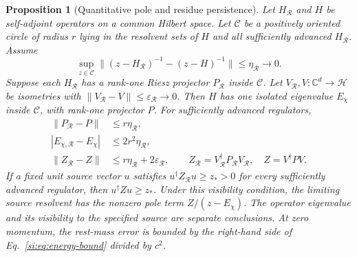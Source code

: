 \documentclass[11pt,a4paper]{article}
\newtheorem{proposition}{Proposition}\renewcommand{\theproposition}{S\arabic{proposition}}
\begin{document}
\begin{proposition}[Quantitative pole and residue persistence]\label{si:prop:persistence}
Let $H_{\mathcal R}$ and $H$ be self-adjoint operators on a common Hilbert space. Let $\mathcal C$ be a positively oriented circle of radius $r$ lying in the resolvent sets of $H$ and all sufficiently advanced $H_{\mathcal R}$. Assume
\begin{equation}\label{si:eq:resolvent-limit}
\sup_{z\in\mathcal C}\|(z-H_{\mathcal R})^{-1}-(z-H)^{-1}\|\leq\eta_{\mathcal R}\longrightarrow0.
\end{equation}
Suppose each $H_{\mathcal R}$ has a rank-one Riesz projector $P_{\mathcal R}$ inside $\mathcal C$. Let $V_{\mathcal R},V:\mathbb C^d\to\mathcal H$ be isometries with $\|V_{\mathcal R}-V\|\leq\varepsilon_{\mathcal R}\to0$. Then $H$ has one isolated eigenvalue $E_\chi$ inside $\mathcal C$, with rank-one projector $P$. For sufficiently advanced regulators,
\begin{align}
\|P_{\mathcal R}-P\|&\leq r\eta_{\mathcal R},\label{si:eq:projector-bound}\\
|E_{\chi,\mathcal R}-E_\chi|&\leq2r^2\eta_{\mathcal R},\label{si:eq:energy-bound}\\
\|Z_{\mathcal R}-Z\|&\leq r\eta_{\mathcal R}+2\varepsilon_{\mathcal R},\qquad
Z_{\mathcal R}=V_{\mathcal R}^\dagger P_{\mathcal R}V_{\mathcal R},\quad Z=V^\dagger PV.\label{si:eq:residue-bound}
\end{align}
If a fixed unit source vector $u$ satisfies $u^\dagger Z_{\mathcal R}u\geq z_*>0$ for every sufficiently advanced regulator, then $u^\dagger Zu\geq z_*$. Under this visibility condition, the limiting source resolvent has the nonzero pole term $Z/(z-E_\chi)$. The operator eigenvalue and its visibility to the specified source are separate conclusions. At zero momentum, the rest-mass error is bounded by the right-hand side of Eq.~\eqref{si:eq:energy-bound} divided by $c^2$.
\end{proposition}
\end{document}
